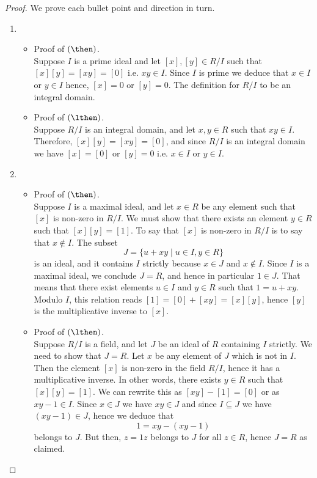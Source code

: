 \documentclass[12pt, a4paper]{article}
\begin{document}
\begin{proof}
    We prove each bullet point and direction in turn.
    \begin{enumerate}
        \item \begin{itemize}
            \item Proof of \((\then)\). \\
            Suppose \(I\) is a prime ideal and let \([x],[y] \in R/I\) such that \([x][y]=[xy]=[0]\) i.e. \(xy \in I\). Since \(I\) is prime we deduce that \(x\in I\) or \(y\in I\) hence, \([x]=0\) or \([y]=0\). The definition for \(R/I\) to be an integral domain.
            \item Proof of \((\lthen)\). \\
            Suppose \(R/I\) is an integral domain, and let \(x,y\in R\) such that \(xy \in I\). Therefore, \([x][y]=[xy]=[0]\), and since \(R/I\) is an integral domain we have \([x]=[0]\) or \([y]=0\) i.e. \(x\in I\) or \(y\in I\).
        \end{itemize}
        \item \begin{itemize}
            \item Proof of \((\then)\). \\
            Suppose \( I \) is a maximal ideal, and let \( x \in R \) be any element such that \( [x] \) is non-zero in \( R/I \). We must show that there exists an element \( y \in R \) such that \( [x][y] = [1] \). To say that \( [x] \) is non-zero in \( R/I \) is to say that \( x \notin I \). The subset
            \[
            J = \{ u + xy \mid u \in I, y \in R \}
            \]
            is an ideal, and it contains \( I \) strictly because \( x \in J \) and \( x \notin I \). Since \( I \) is a maximal ideal, we conclude \( J = R \), and hence in particular \( 1 \in J \). That means that there exist elements \( u \in I \) and \( y \in R \) such that \( 1 = u + xy \). Modulo \( I \), this relation reads \( [1] = [0] + [xy] = [x][y] \), hence \( [y] \) is the multiplicative inverse to \( [x] \).
            \item Proof of \((\lthen)\). \\
            Suppose \( R/I \) is a field, and let \( J \) be an ideal of \( R \) containing \( I \) strictly. We need to show that \( J = R \). Let \( x \) be any element of \( J \) which is not in \( I \). Then the element \( [x] \) is non-zero in the field \( R/I \), hence it has a multiplicative inverse. In other words, there exists \( y \in R \) such that \( [x][y] = [1] \). We can rewrite this as \( [xy] - [1] = [0] \) or as \( xy - 1 \in I \). Since \( x \in J \) we have \( xy \in J \) and since \( I \subseteq J \) we have \( (xy - 1) \in J \), hence we deduce that
            \[
            1 = xy - (xy - 1)
            \]
            belongs to \( J \). But then, \( z = 1z \) belongs to \( J \) for all \( z \in R \), hence \( J = R \) as claimed. 
        \end{itemize}
    \end{enumerate}
\end{proof}
\end{document}
